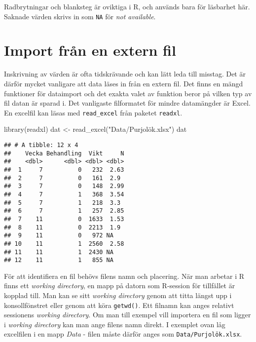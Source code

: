 \documentclass[
]{book}
\newenvironment{Shaded}{\begin{snugshade}}{\end{snugshade}}
\newcommand{\FunctionTok}[1]{\textcolor[rgb]{0.00,0.00,0.00}{#1}}
\newcommand{\NormalTok}[1]{#1}
\newcommand{\OtherTok}[1]{\textcolor[rgb]{0.56,0.35,0.01}{#1}}
\newcommand{\StringTok}[1]{\textcolor[rgb]{0.31,0.60,0.02}{#1}}
\theoremstyle{definition}
\theoremstyle{definition}
\theoremstyle{definition}
\theoremstyle{definition}
\theoremstyle{remark}
\begin{document}
Radbrytningar och blanksteg är oviktiga i R, och används bara för läsbarhet här. Saknade värden skrivs in som \texttt{NA} för \emph{not available}.

\hypertarget{import-fruxe5n-en-extern-fil}{%
\section{Import från en extern fil}\label{import-fruxe5n-en-extern-fil}}

Inskrivning av värden är ofta tidskrävande och kan lätt leda till misstag. Det är därför mycket vanligare att data läses in från en extern fil. Det finns en mängd funktioner för dataimport och det exakta valet av funktion beror på vilken typ av fil datan är sparad i. Det vanligaste filformatet för mindre datamängder är Excel. En excelfil kan läsas med \texttt{read\_excel} från paketet \texttt{readxl}.

\begin{Shaded}
\begin{Highlighting}[]
\FunctionTok{library}\NormalTok{(readxl)}
\NormalTok{dat }\OtherTok{\textless{}{-}} \FunctionTok{read\_excel}\NormalTok{(}\StringTok{"Data/Purjolök.xlsx"}\NormalTok{)}
\NormalTok{dat}
\end{Highlighting}
\end{Shaded}

\begin{verbatim}
## # A tibble: 12 x 4
##    Vecka Behandling  Vikt     N
##    <dbl>      <dbl> <dbl> <dbl>
##  1     7          0   232  2.63
##  2     7          0   161  2.9 
##  3     7          0   148  2.99
##  4     7          1   368  3.54
##  5     7          1   218  3.3 
##  6     7          1   257  2.85
##  7    11          0  1633  1.53
##  8    11          0  2213  1.9 
##  9    11          0   972 NA   
## 10    11          1  2560  2.58
## 11    11          1  2430 NA   
## 12    11          1   855 NA
\end{verbatim}

För att identifiera en fil behövs filens namn och placering. När man arbetar i R finns ett \emph{working directory}, en mapp på datorn som R-session för tillfället är kopplad till. Man kan se sitt \emph{working directory} genom att titta längst upp i konsollfönstret eller genom att köra \texttt{getwd()}. Ett filnamn kan anges relativt sessionens \emph{working directory}. Om man till exempel vill importera en fil som ligger i \emph{working directory} kan man ange filens namn direkt. I exemplet ovan låg excelfilen i en mapp \emph{Data} - filen måste därför anges som \texttt{Data/Purjolök.xlsx}.
\end{document}
